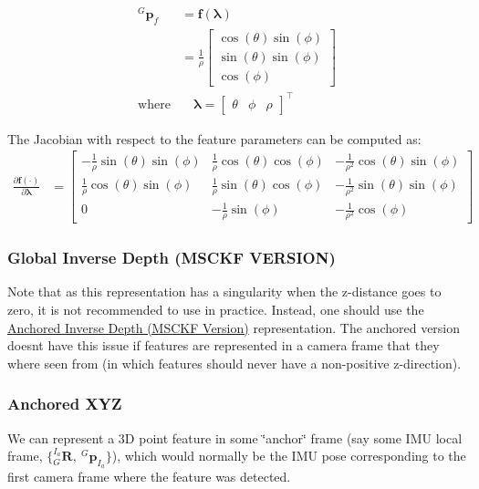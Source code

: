 \begin{align*} {}^{G}\mathbf{p}_f &= \mathbf f(\boldsymbol\lambda) \\ &= \frac{1}{\rho}\begin{bmatrix} \cos(\theta)\sin(\phi) \\ \sin(\theta)\sin(\phi) \\ \cos(\phi) \end{bmatrix} \\ \text{where} &\quad \boldsymbol\lambda = \begin{bmatrix} \theta & \phi & \rho \end{bmatrix}^\top \end{align*}

The Jacobian with respect to the feature parameters can be computed as\+: \begin{align*} \frac{\partial \mathbf f(\cdot)}{\partial \boldsymbol\lambda} &= \begin{bmatrix} -\frac{1}{\rho}\sin(\theta)\sin(\phi) & \frac{1}{\rho}\cos(\theta)\cos(\phi) & -\frac{1}{\rho^2}\cos(\theta)\sin(\phi) \\ \frac{1}{\rho}\cos(\theta)\sin(\phi) & \frac{1}{\rho}\sin(\theta)\cos(\phi) & -\frac{1}{\rho^2}\sin(\theta)\sin(\phi) \\ 0 & -\frac{1}{\rho}\sin(\phi) & -\frac{1}{\rho^2}\cos(\phi) \end{bmatrix} \end{align*}\hypertarget{update-feat_feat-rep-global-inv2}{}\subsubsection{Global Inverse Depth (\+M\+S\+C\+K\+F V\+E\+R\+S\+I\+O\+N)}\label{update-feat_feat-rep-global-inv2}
Note that as this representation has a singularity when the z-\/distance goes to zero, it is not recommended to use in practice. Instead, one should use the \hyperlink{update-feat_feat-rep-anchor-inv2}{Anchored Inverse Depth (M\+S\+C\+KF Version)} representation. The anchored version doesn\textquotesingle{}t have this issue if features are represented in a camera frame that they where seen from (in which features should never have a non-\/positive z-\/direction).\hypertarget{update-feat_feat-rep-anchor-xyz}{}\subsubsection{Anchored X\+YZ}\label{update-feat_feat-rep-anchor-xyz}
We can represent a 3D point feature in some \char`\"{}anchor\char`\"{} frame (say some I\+MU local frame, $\{{}^{I_a}_{G}\mathbf{R},~{}^{G}\mathbf{p}_{I_a}\}$), which would normally be the I\+MU pose corresponding to the first camera frame where the feature was detected.


